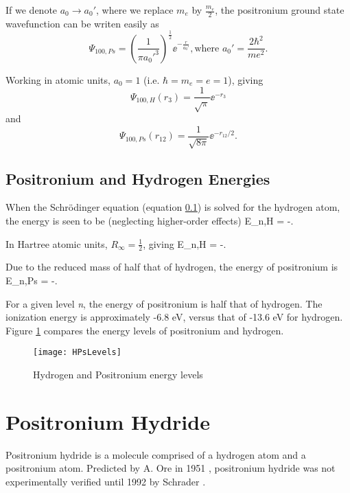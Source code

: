 \documentclass[Introduction.tex]{subfiles}
\begin{document}
If we denote $a_0 \rightarrow a_0'$, where we replace $m_e$ by $\frac{m_e}{2}$, the positronium ground state wavefunction can be writen easily as
\begin{equation}
\Psi_{100,Ps} = \left(\frac{1}{\pi {a_0'}^3}\right)^{\frac{1}{2}} \!\! \ee^{-\frac{r}{a_0'}},
\text{where } a_0' = \frac{2\hbar^2}{m e^2}.
\end{equation}

Working in atomic units, $a_0 = 1$ (i.e. $\hbar = m_e = e = 1$), giving
\begin{equation}
\Psi_{100,H}\left(r_3\right) = \frac{1}{\sqrt{\pi}} \ee^{-r_3}
\label{eq:HWave}
\end{equation}
and
\begin{equation}
\Psi_{100,Ps}\left(r_{12}\right) = \frac{1}{\sqrt{8 \pi}} \ee^{-r_{12}/2}.
\label{eq:PsWave}
\end{equation}

\subsection{Positronium and Hydrogen Energies}

When the Schr\"{o}dinger equation (equation \ref{}) is solved for the hydrogen atom, the energy is seen to be (neglecting higher-order effects)
\beq
\label{eq:HEnergy}
E_{n,H} = -.
\eeq

\noindent In Hartree atomic units, $R_\infty = \frac{1}{2}$, giving
\beq
\label{eq:HEnergyAU}
E_{n,H} = -.
\eeq

\noindent Due to the reduced mass of half that of hydrogen, the energy of positronium is
\beq
\label{eq:PsEnergyAU}
E_{n,Ps} = -.
\eeq

\noindent For a given level \emph{n}, the energy of positronium is half that of hydrogen.  The ionization energy is approximately -6.8 eV, versus that of -13.6 eV for hydrogen.  Figure \ref{fig:HPsLevels} compares the energy levels of positronium and hydrogen.

\begin{figure}[H]
	\centering
	\texttt{[image: HPsLevels]}
	\caption{Hydrogen and Positronium energy levels}
	\label{fig:HPsLevels}
\end{figure}

\section{Positronium Hydride}
\label{sec:PsH}
Positronium hydride is a molecule comprised of a hydrogen atom and a positronium atom.  Predicted by A. Ore in 1951 \cite{Ore1951}, positronium hydride was not experimentally verified until 1992 by Schrader \cite{Schrader1992}.
\end{document}
